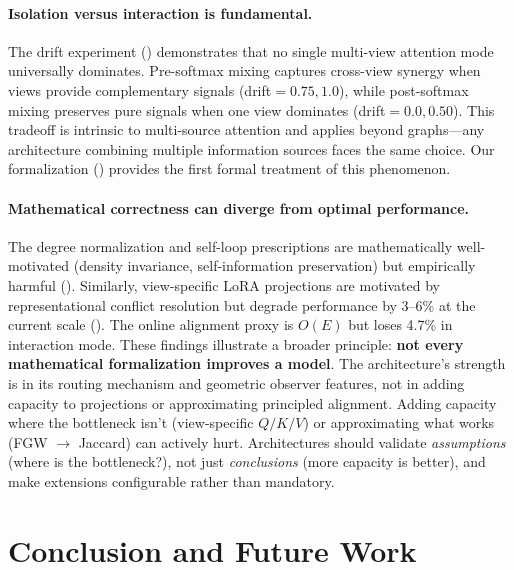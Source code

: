 \documentclass[11pt,a4paper]{article}
\begin{document}
\paragraph{Isolation versus interaction is fundamental.}
The drift experiment () demonstrates that no single
multi-view attention mode universally dominates.
Pre-softmax mixing captures cross-view synergy when views provide
complementary signals (drift${}=0.75, 1.0$), while post-softmax mixing
preserves pure signals when one view dominates (drift${}=0.0, 0.50$).
This tradeoff is intrinsic to multi-source attention and applies beyond
graphs---any architecture combining multiple information sources faces
the same choice.
Our formalization () provides the first formal
treatment of this phenomenon.

\paragraph{Mathematical correctness can diverge from optimal
performance.}
The degree normalization and self-loop prescriptions are mathematically
well-motivated (density invariance, self-information preservation) but
empirically harmful ().
Similarly, view-specific LoRA projections are motivated by
representational conflict resolution but degrade performance by 3--6\%
at the current scale ().
The online alignment proxy is $O(E)$ but loses 4.7\% in interaction mode.
These findings illustrate a broader principle: \textbf{not every
mathematical formalization improves a model}.
The architecture's strength is in its routing mechanism and geometric
observer features, not in adding capacity to projections or
approximating principled alignment.
Adding capacity where the bottleneck isn't (view-specific $Q/K/V$) or
approximating what works (FGW $\to$ Jaccard) can actively hurt.
Architectures should validate \emph{assumptions} (where is the
bottleneck?), not just \emph{conclusions} (more capacity is better),
and make extensions configurable rather than mandatory.

\section{Conclusion and Future Work}
\label{sec:conclusion}
\end{document}
